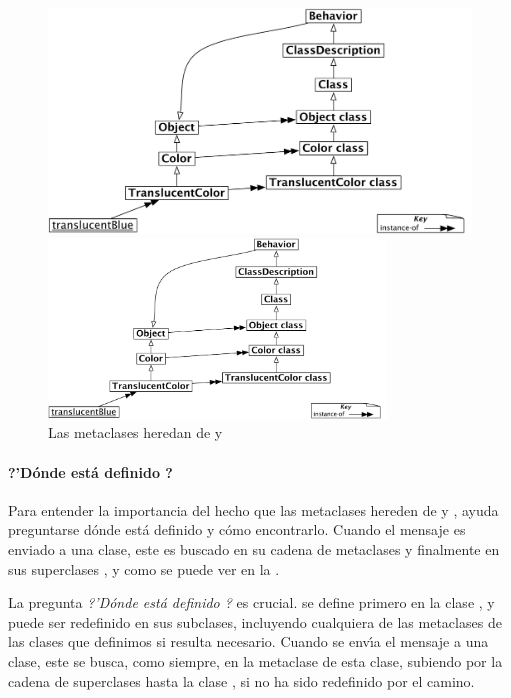 \documentclass[a4paper,10pt,twoside]{book}
\begin{document}
\begin{center}
\begin{figure}
\ifluluelse
	{\centerline{\includegraphics[width=\textwidth]{TranslucentBehavior}}}
	{\centerline{\includegraphics[width=0.8\textwidth]{TranslucentBehavior}}}
\caption{Las metaclases heredan de  y }
\end{figure}
\end{center}

\paragraph{?'D\'onde est\'a definido ?}
Para entender la importancia del hecho que las metaclases hereden de  y , ayuda preguntarse d\'onde est\'a definido  y c\'omo encontrarlo. Cuando el mensaje  es enviado a una clase, este es buscado en su cadena de metaclases y finalmente en sus superclases ,  y  como se puede ver en la .

La pregunta \emph{?'D\'onde est\'a definido ?} es crucial.  se define primero en la clase , y puede ser redefinido en sus subclases, incluyendo cualquiera de las metaclases de las clases que definimos si resulta necesario. Cuando se env\'{\i}a el mensaje  a una clase, este se busca, como siempre, en la metaclase de esta clase, subiendo por la cadena de superclases hasta la clase , si no ha sido redefinido por el camino.
\end{document}
